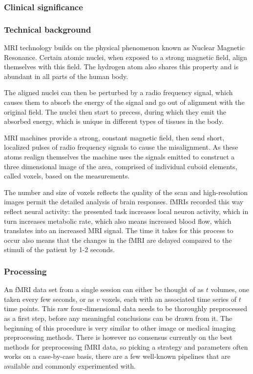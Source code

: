 		\subsubsection{Clinical significance }
		
		
		
	
		\subsubsection{Technical background}
		
		MRI technology builds on the physical phenomenon known as Nuclear Magnetic Resonance. Certain atomic nuclei, when exposed to a strong magnetic field, align themselves with this field. The hydrogen atom also shares this property and is abundant in all parts of the human body. 
		
		The aligned nuclei can then be perturbed by a radio frequency signal, which causes them to absorb the energy of the signal and go out of alignment with the original field. The nuclei then start to precess, during which they emit the absorbed energy, which is unique in different types of tissues in the body\cite{plewes2012physics}.
		
		MRI machines provide a strong, constant magnetic field, then send short, localized pulses of radio frequency signals to cause the misalignment. As these atoms realign themselves the machine uses the signals emitted to construct a three dimensional image of the area, comprised of individual cuboid elements, called voxels, based on the measurements.
		
		
		The number and size of voxels reflects the quality of the scan and high-resolution images permit the detailed analysis of brain responses. fMRIs recorded this way reflect neural activity: the presented task increases local neuron activity, which in turn increases metabolic rate, which also means increased blood flow, which translates into an increased MRI signal. The time it takes for this process to occur also means that the changes in the fMRI are delayed compared to the stimuli of the patient by 1-2 seconds\cite{deyoe1994functional}.
		
		
		\subsubsection{Processing}
		
		An fMRI data set from a single session can either be thought of as $t$ volumes, one taken every few seconds, or as $v$ voxels, each with an associated time series of $t$ time points\cite{smith2004overview}. This raw four-dimensional data needs to be thoroughly preprocessed as a first step, before any meaningful conclusions can be drawn from it. The beginning of this procedure is very similar to other image or medical imaging preprocessing methods. There is however no consensus currently on the best methods for preprocessing fMRI data, so picking a strategy and parameters often works on a case-by-case basis, there are a few well-known pipelines that are available and commonly experimented with\cite{strother2006evaluating}.
		
